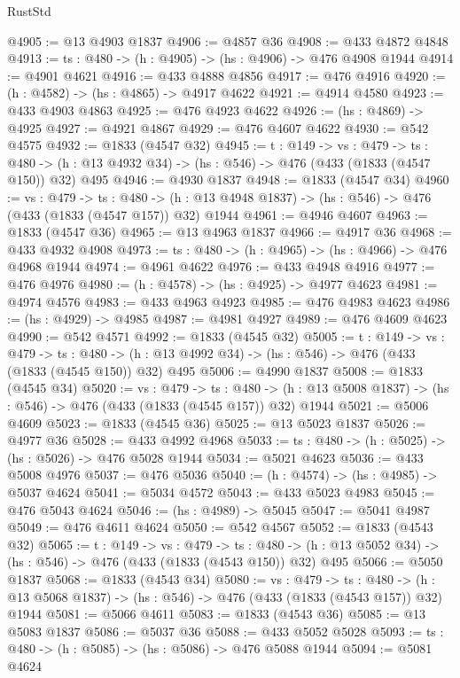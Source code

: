 \begin{lexlean}{RustStd}
\begin{coremodule}
@4905 := @13 @4903 @1837
@4906 := @4857 @36
@4908 := @433 @4872 @4848
@4913 := {ts : @480} -> (h : @4905) -> (hs : @4906) -> @476 @4908 @1944
@4914 := @4901 @4621
@4916 := @433 @4888 @4856
@4917 := @476 @4916
@4920 := (h : @4582) -> (hs : @4865) -> @4917 @4622
@4921 := @4914 @4580
@4923 := @433 @4903 @4863
@4925 := @476 @4923 @4622
@4926 := (hs : @4869) -> @4925
@4927 := @4921 @4867
@4929 := @476 @4607 @4622
@4930 := @542 @4575
@4932 := @1833 (@4547 @32)
@4945 := {t : @149} ->
  {vs : @479} ->
  {ts : @480} -> (h : @13 @4932 @34) -> (hs : @546) -> @476 (@433 (@1833 (@4547 @150)) @32) @495
@4946 := @4930 @1837
@4948 := @1833 (@4547 @34)
@4960 := {vs : @479} ->
  {ts : @480} -> (h : @13 @4948 @1837) -> (hs : @546) -> @476 (@433 (@1833 (@4547 @157)) @32) @1944
@4961 := @4946 @4607
@4963 := @1833 (@4547 @36)
@4965 := @13 @4963 @1837
@4966 := @4917 @36
@4968 := @433 @4932 @4908
@4973 := {ts : @480} -> (h : @4965) -> (hs : @4966) -> @476 @4968 @1944
@4974 := @4961 @4622
@4976 := @433 @4948 @4916
@4977 := @476 @4976
@4980 := (h : @4578) -> (hs : @4925) -> @4977 @4623
@4981 := @4974 @4576
@4983 := @433 @4963 @4923
@4985 := @476 @4983 @4623
@4986 := (hs : @4929) -> @4985
@4987 := @4981 @4927
@4989 := @476 @4609 @4623
@4990 := @542 @4571
@4992 := @1833 (@4545 @32)
@5005 := {t : @149} ->
  {vs : @479} ->
  {ts : @480} -> (h : @13 @4992 @34) -> (hs : @546) -> @476 (@433 (@1833 (@4545 @150)) @32) @495
@5006 := @4990 @1837
@5008 := @1833 (@4545 @34)
@5020 := {vs : @479} ->
  {ts : @480} -> (h : @13 @5008 @1837) -> (hs : @546) -> @476 (@433 (@1833 (@4545 @157)) @32) @1944
@5021 := @5006 @4609
@5023 := @1833 (@4545 @36)
@5025 := @13 @5023 @1837
@5026 := @4977 @36
@5028 := @433 @4992 @4968
@5033 := {ts : @480} -> (h : @5025) -> (hs : @5026) -> @476 @5028 @1944
@5034 := @5021 @4623
@5036 := @433 @5008 @4976
@5037 := @476 @5036
@5040 := (h : @4574) -> (hs : @4985) -> @5037 @4624
@5041 := @5034 @4572
@5043 := @433 @5023 @4983
@5045 := @476 @5043 @4624
@5046 := (hs : @4989) -> @5045
@5047 := @5041 @4987
@5049 := @476 @4611 @4624
@5050 := @542 @4567
@5052 := @1833 (@4543 @32)
@5065 := {t : @149} ->
  {vs : @479} ->
  {ts : @480} -> (h : @13 @5052 @34) -> (hs : @546) -> @476 (@433 (@1833 (@4543 @150)) @32) @495
@5066 := @5050 @1837
@5068 := @1833 (@4543 @34)
@5080 := {vs : @479} ->
  {ts : @480} -> (h : @13 @5068 @1837) -> (hs : @546) -> @476 (@433 (@1833 (@4543 @157)) @32) @1944
@5081 := @5066 @4611
@5083 := @1833 (@4543 @36)
@5085 := @13 @5083 @1837
@5086 := @5037 @36
@5088 := @433 @5052 @5028
@5093 := {ts : @480} -> (h : @5085) -> (hs : @5086) -> @476 @5088 @1944
@5094 := @5081 @4624

\end{coremodule}
\end{lexlean}
